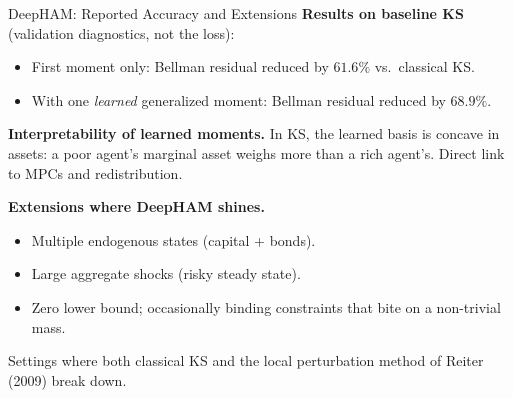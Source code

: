 \documentclass[aspectratio=169,11pt]{beamer}
\begin{document}
\begin{frame}{DeepHAM: Reported Accuracy and Extensions}
\small
\textbf{Results on baseline KS} (validation diagnostics, not the loss):
\begin{itemize}\itemsep2pt
    \item First moment only: Bellman residual reduced by $61.6\%$ vs.\ classical KS.
    \item With one \emph{learned} generalized moment: Bellman residual reduced by $68.9\%$.
\end{itemize}

\vspace{0.4em}
\textbf{Interpretability of learned moments.}  In KS, the learned basis is concave in assets: a poor agent's marginal asset weighs more than a rich agent's.  Direct link to MPCs and redistribution.

\vspace{0.4em}
\textbf{Extensions where DeepHAM shines.}
\begin{itemize}\itemsep1pt
    \item Multiple endogenous states (capital + bonds).
    \item Large aggregate shocks (risky steady state).
    \item Zero lower bound; occasionally binding constraints that bite on a non-trivial mass.
\end{itemize}

\vspace{0.3em}
{\scriptsize Settings where both classical KS and the local perturbation method of Reiter (2009) break down.}
\end{frame}
\end{document}
